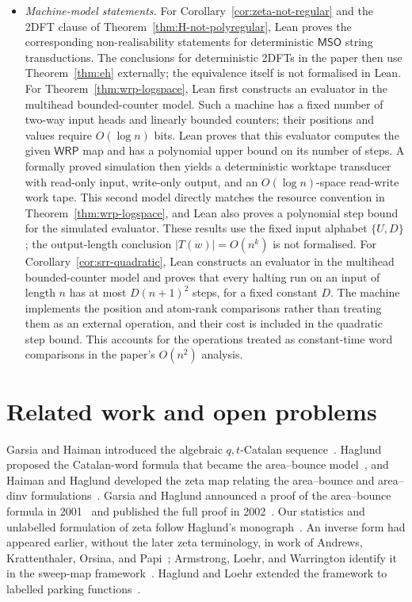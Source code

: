 \documentclass[11pt]{article}
\theoremstyle{definition}
\newcommand{\WRP}{\mathsf{WRP}}
\newcommand{\MSO}{\mathsf{MSO}}
\begin{document}
\begin{itemize}[leftmargin=*,itemsep=0.5em]
\item \emph{Machine-model statements.}
For Corollary~\ref{cor:zeta-not-regular} and the 2DFT clause of
Theorem~\ref{thm:H-not-polyregular}, Lean proves the corresponding
non-realisability statements for deterministic $\MSO$ string transductions.
The conclusions for deterministic 2DFTs in the paper then use
Theorem~\ref{thm:eh} externally; the equivalence itself is not formalised in
Lean.
For Theorem~\ref{thm:wrp-logspace}, Lean first constructs an evaluator in the
multihead bounded-counter model.  Such a machine has a fixed number of two-way
input heads and linearly bounded counters; their positions and values require
$O(\log n)$ bits.  Lean proves that this evaluator computes the given $\WRP$
map and has a polynomial upper bound on its number of steps.  A formally proved
simulation then yields a deterministic worktape transducer with read-only
input, write-only output, and an $O(\log n)$-space read-write work tape.  This
second model directly matches the resource convention in
Theorem~\ref{thm:wrp-logspace}, and Lean also proves a polynomial step bound for
the simulated evaluator.  These results use the fixed input alphabet
$\{U,D\}$; the output-length conclusion $|T(w)|=O(n^k)$ is not formalised.
For Corollary~\ref{cor:srr-quadratic}, Lean constructs an evaluator in the
multihead bounded-counter model and proves that every halting run on an input
of length $n$ has at most $D(n+1)^2$ steps, for a fixed constant $D$.  The
machine implements the position and atom-rank comparisons rather than treating
them as an external operation, and their cost is included in the quadratic
step bound.  This accounts for the operations treated as constant-time word
comparisons in the paper's $O(n^2)$ analysis.
\end{itemize}

\section{Related work and open problems}%
\label{sec:discussion}\label{sec:related-work}

Garsia and Haiman introduced the algebraic $q,t$-Catalan
sequence~\cite{GarsiaHaiman1996}.  Haglund proposed the Catalan-word formula that
became the area--bounce model~\cite{Haglund2003}, and Haiman and Haglund
developed the zeta map relating the area--bounce and area--dinv
formulations~\cite[Section~2]{ThomasWilliams2018}.  Garsia and Haglund
announced a proof of the area--bounce formula in 2001~\cite{GarsiaHaglund2001}
and published the full proof in
2002~\cite{GarsiaHaglund2002}.  Our statistics and unlabelled formulation of
zeta follow Haglund's monograph~\cite{Haglund2008}.
An inverse form had appeared earlier, without the later zeta terminology, in
work of Andrews, Krattenthaler, Orsina, and Papi~\cite{AndrewsEtAl2002};
Armstrong, Loehr, and Warrington identify it in the sweep-map
framework~\cite{ArmstrongLoehrWarrington2015}.  Haglund and Loehr extended the
framework to labelled parking functions~\cite{HaglundLoehr2005}.
\end{document}
